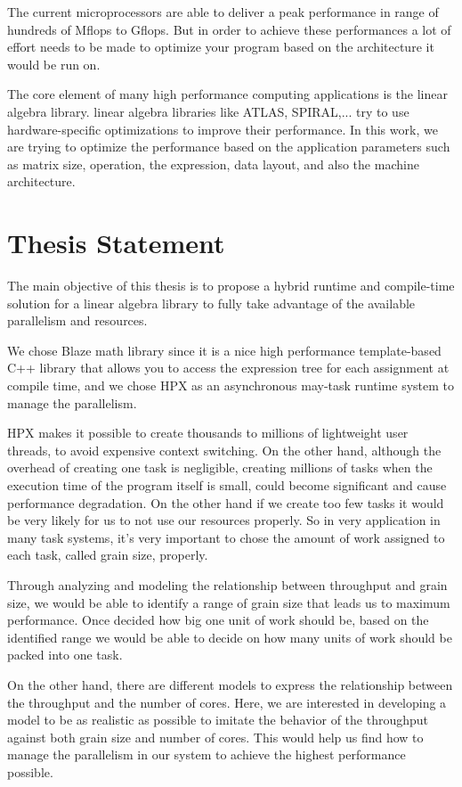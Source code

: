 The current microprocessors are able to deliver a peak performance in range of hundreds of Mflops to Gflops. But in order to achieve these performances a lot of effort needs to be made to optimize your program based on the architecture it would be run on\cite{whaley1998automatically}. 

The core element of many high performance computing applications is the linear algebra library. linear algebra libraries like ATLAS, SPIRAL,... try to use hardware-specific optimizations to improve their performance. In this work, we are trying to optimize the performance based on the application parameters such as matrix size, operation, the expression, data layout, and also the machine architecture.   


\vspace{\baselineskip}
\section{Thesis Statement}
The main objective of this thesis is to propose a hybrid runtime and compile-time solution for a linear algebra library to fully take advantage of the available parallelism and resources. 

We chose Blaze math library since it is a nice high performance template-based C++ library that allows you to access the expression tree for each assignment at compile time, and we chose HPX as an asynchronous may-task runtime system to manage the parallelism. 

HPX makes it possible to create thousands to millions of lightweight user threads, to avoid expensive context switching. On the other hand, although the overhead of creating one task is negligible, creating millions of tasks when the execution time of the program itself is small, could become significant and cause performance degradation. On the other hand if we create too few tasks it would be very likely for us to not use our resources properly. So in very application in many task systems, it's very important to chose the amount of work assigned to each task, called grain size, properly. 

Through analyzing and modeling the relationship between throughput and grain size, we would be able to identify a range of grain size that leads us to maximum performance. Once decided how big one unit of work should be, based on the identified range we would be able to decide on how many units of work should be packed into one task.

On the other hand, there are different models to express the relationship between the throughput and the number of cores. Here, we are interested in developing a model to be as realistic as possible to imitate the behavior of the throughput against both grain size and number of cores. This would help us find how to manage the parallelism in our system to achieve the highest performance possible.
 
